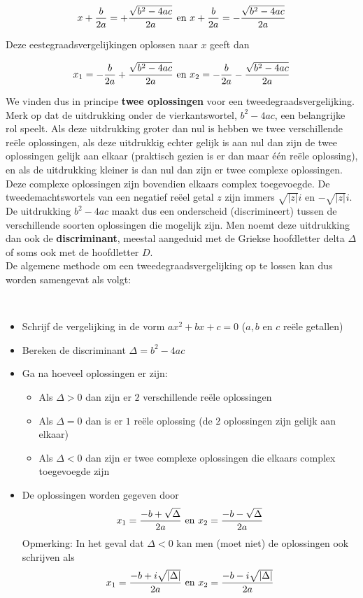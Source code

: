 \[ x+\frac{b}{2a} = + \frac{\sqrt{b^2 - 4ac}}{2a} \textup{  en  } x+\frac{b}{2a} = - \frac{\sqrt{b^2 - 4ac}}{2a} \]

Deze eestegraadsvergelijkingen oplossen naar $x$ geeft dan

\[ x_{1}=-\frac{b}{2a}+ \frac{\sqrt{b^2 - 4ac}}{2a} \textup{  en  } x_{2}=-\frac{b}{2a}- \frac{\sqrt{b^2 - 4ac}}{2a} \]

We vinden dus in principe {\bf twee oplossingen} voor een tweedegraadsvergelijking.\\
Merk op dat de uitdrukking onder de vierkantswortel, $b^2 - 4ac$, een belangrijke rol speelt. Als deze uitdrukking groter dan nul is hebben we twee verschillende re\"{e}le oplossingen, als deze uitdrukkig echter gelijk is aan nul dan zijn de twee oplossingen gelijk aan elkaar (praktisch gezien is er dan maar \'{e}\'{e}n  re\"{e}le oplossing), en als de uitdrukking kleiner is dan nul dan zijn er twee complexe oplossingen. Deze complexe oplossingen zijn bovendien elkaars complex toegevoegde. De tweedemachtswortels van een negatief re\"{e}el getal $z$ zijn immers $\sqrt{|z|}i$ en $-\sqrt{|z|}i$.\\
De uitdrukking $b^2 - 4ac$ maakt dus een onderscheid (discrimineert) tussen de verschillende soorten oplossingen die mogelijk zijn. Men noemt deze uitdrukking dan ook de {\bf discriminant}, meestal aangeduid met de Griekse hoofdletter delta $\Delta$ of soms ook met de hoofdletter $D$.\\

De algemene methode om een tweedegraadsvergelijking op te lossen kan dus worden samengevat als volgt:\\


\begin{ftonthoud}
	\ \\
	\begin{itemize}
\item Schrijf de vergelijking in de vorm $ax^2 + bx + c = 0$     ($a,b$ en $c$ re\"{e}le getallen)
\item Bereken de discriminant $\Delta = b^2 - 4ac$
\item Ga na hoeveel oplossingen er zijn:
        \begin{itemize} \item Als $\Delta >0$ dan zijn er $2$ verschillende re\"{e}le oplossingen \item Als $\Delta=0$ dan is er $1$ re\"{e}le oplossing (de $2$ oplossingen zijn gelijk aan elkaar) \item Als $\Delta <0$ dan zijn er twee complexe oplossingen die elkaars complex toegevoegde zijn \end{itemize}
\item De oplossingen worden gegeven door
\[ x_{1}=\frac{-b + \sqrt{\Delta}}{2a} \textup{  en  } x_{2}=\frac{-b - \sqrt{\Delta}}{2a} \]
Opmerking: In het geval dat $\Delta <0$ kan men (moet niet) de oplossingen ook schrijven als
\[ x_{1}=\frac{-b +i \sqrt{|\Delta|}}{2a} \textup{  en  } x_{2}=\frac{-b -i \sqrt{|\Delta|}}{2a} \]
\end{itemize}

\end{ftonthoud}

